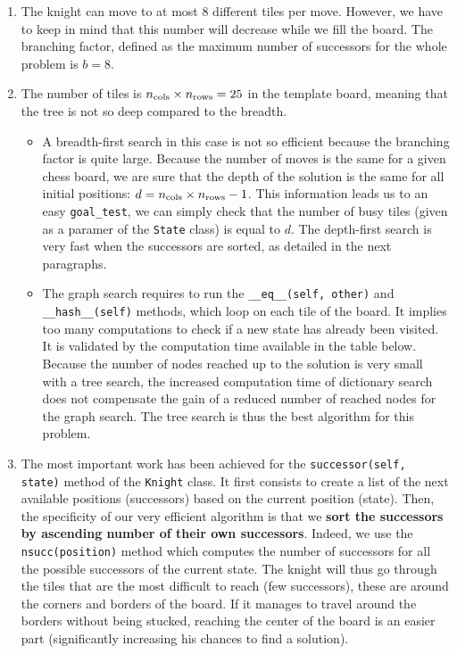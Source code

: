 \documentclass[a4paper,10pt]{article}
\newcommand{\py}[1]{\texttt{#1}}
\begin{document}
\begin{enumerate}
 \item The knight can move to at most 8 different tiles per move.
 However, we have to keep in mind that this number will decrease while we fill the board. The branching factor, defined as the maximum number of successors for the whole problem is $b = 8$.
 \item The number of tiles is $n_{\textnormal{cols}} \times n_{\vphantom{l}\textnormal{rows}} = 25$ in the template board, meaning that the tree is not so deep compared to the breadth.
 \begin{itemize}
  \item A breadth-first search in this case is not so efficient because the branching factor is quite large.
  Because the number of moves is the same for a given chess board, we are sure that the depth of the solution is the same for all initial positions: $d = n_{\textnormal{cols}} \times n_{\textnormal{rows}} - 1$.
  This information leads us to an easy \py{goal_test}, we can simply check that the number of busy tiles (given as a paramer of the \py{State} class) is equal to $d$. The depth-first search is very fast when the successors are sorted, as detailed in the next paragraphs.
  \item The graph search requires to run the \py{__eq__(self, other)} and \py{__hash__(self)} methods, which loop on each tile of the board. It implies too many computations to check if a new state has already been visited. It is validated by the computation time available in the table below. Because the number of nodes reached up to the solution is very small with a tree search, the increased computation time of dictionary search does not compensate the gain of a reduced number of reached nodes for the graph search. The tree search is thus the best algorithm for this problem.
 \end{itemize}
 \item The most important work has been achieved for the \py{successor(self, state)} method of the \py{Knight} class. It first consists to create a list of the next available positions (successors) based on the current position (state). Then, the specificity of our very efficient algorithm is that we \textbf{sort the successors by ascending number of their own successors}. Indeed, we use the \py{nsucc(position)} method which computes the number of successors for all the possible successors of the current state. The knight will thus go through the tiles that are the most difficult to reach (few successors), these are around the corners and borders of the board. If it manages to travel around the borders without being stucked, reaching the center of the board is an easier part (significantly increasing his chances to find a solution).
 

\end{enumerate}
\end{document}
